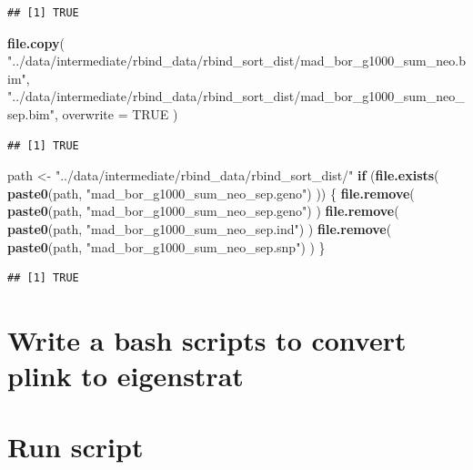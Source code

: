 \documentclass[
]{article}
\newenvironment{Shaded}{\begin{snugshade}}{\end{snugshade}}
\newcommand{\AttributeTok}[1]{\textcolor[rgb]{0.13,0.29,0.53}{#1}}
\newcommand{\ConstantTok}[1]{\textcolor[rgb]{0.56,0.35,0.01}{#1}}
\newcommand{\ControlFlowTok}[1]{\textcolor[rgb]{0.13,0.29,0.53}{\textbf{#1}}}
\newcommand{\FunctionTok}[1]{\textcolor[rgb]{0.13,0.29,0.53}{\textbf{#1}}}
\newcommand{\NormalTok}[1]{#1}
\newcommand{\OtherTok}[1]{\textcolor[rgb]{0.56,0.35,0.01}{#1}}
\newcommand{\StringTok}[1]{\textcolor[rgb]{0.31,0.60,0.02}{#1}}
\begin{document}
\begin{verbatim}
## [1] TRUE
\end{verbatim}

\begin{Shaded}
\begin{Highlighting}[]
\FunctionTok{file.copy}\NormalTok{(}
  \StringTok{"../data/intermediate/rbind\_data/rbind\_sort\_dist/mad\_bor\_g1000\_sum\_neo.bim"}\NormalTok{,}
  \StringTok{"../data/intermediate/rbind\_data/rbind\_sort\_dist/mad\_bor\_g1000\_sum\_neo\_sep.bim"}\NormalTok{,}
  \AttributeTok{overwrite =} \ConstantTok{TRUE}
\NormalTok{)}
\end{Highlighting}
\end{Shaded}

\begin{verbatim}
## [1] TRUE
\end{verbatim}

\begin{Shaded}
\begin{Highlighting}[]
\NormalTok{path }\OtherTok{\textless{}{-}} \StringTok{"../data/intermediate/rbind\_data/rbind\_sort\_dist/"}
\ControlFlowTok{if}\NormalTok{ (}\FunctionTok{file.exists}\NormalTok{(}
  \FunctionTok{paste0}\NormalTok{(path, }\StringTok{"mad\_bor\_g1000\_sum\_neo\_sep.geno"}\NormalTok{)}
\NormalTok{)) \{}
  \FunctionTok{file.remove}\NormalTok{(}
    \FunctionTok{paste0}\NormalTok{(path, }\StringTok{"mad\_bor\_g1000\_sum\_neo\_sep.geno"}\NormalTok{)}
\NormalTok{  )}
  \FunctionTok{file.remove}\NormalTok{(}
    \FunctionTok{paste0}\NormalTok{(path, }\StringTok{"mad\_bor\_g1000\_sum\_neo\_sep.ind"}\NormalTok{)}
\NormalTok{  )}
  \FunctionTok{file.remove}\NormalTok{(}
    \FunctionTok{paste0}\NormalTok{(path, }\StringTok{"mad\_bor\_g1000\_sum\_neo\_sep.snp"}\NormalTok{)}
\NormalTok{  )}
\NormalTok{\}}
\end{Highlighting}
\end{Shaded}

\begin{verbatim}
## [1] TRUE
\end{verbatim}

\section{Write a bash scripts to convert plink to
eigenstrat}\label{write-a-bash-scripts-to-convert-plink-to-eigenstrat-1}

\section{Run script}\label{run-script-1}
\end{document}
